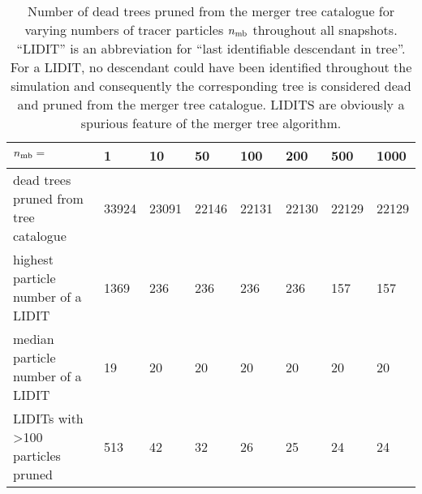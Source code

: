 \begin{table*}
  
  \caption{Number of dead trees pruned from the merger tree catalogue
    for varying numbers of tracer particles $n_{\rm mb}$ throughout
    all snapshots.  ``LIDIT'' is an abbreviation for ``last
    identifiable descendant in tree''.  For a LIDIT, no descendant
    could have been identified throughout the simulation and
    consequently the corresponding tree is considered dead and pruned
    from the merger tree catalogue. LIDITS are obviously a spurious
    feature of the merger tree algorithm.
    \label{tab:ntracers-pruning}
  }
  
  {\small 
    \begin{tabular}[c]{l | p{1cm} | p{1cm} | p{1cm} | p{1cm} | p{1cm} | p{1cm} | p{1cm} |}
      $n_{\rm mb}=$				&	1 	& 	10 	& 	50 	& 	100 	& 200 	& 500 	& 1000  \\
      \hline	
      dead trees pruned from tree catalogue	&	33924	&	23091	&	22146	& 	22131 	& 22130 & 22129 & 22129 \\	
      highest particle number of a LIDIT	&	1369	&	236	&	236	&	236 	& 236 	& 157 	& 157  	\\	
      median particle number of a LIDIT		&	19	&	20	&	20	&	20 	& 20 	& 20 	& 20  	\\
      LIDITs with >100 particles pruned 	&	513	&	42	&	32	&	26 	& 25 	& 24 	& 24  	\\
      \hline
    \end{tabular}
  }
\end{table*}
